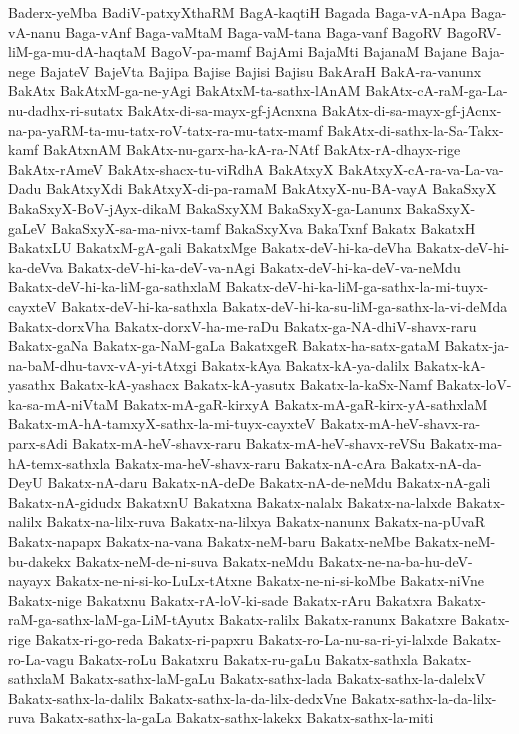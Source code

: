 {Baderx-yeMba
BadiV-patxyXthaRM
BagA-kaqtiH
Bagada
Baga-vA-nApa
Baga-vA-nanu
Baga-vAnf
Baga-vaMtaM
Baga-vaM-tana
Baga-vanf
BagoRV
BagoRV-liM-ga-mu-dA-haqtaM
BagoV-pa-mamf
BajAmi
BajaMti
BajanaM
Bajane
Baja-nege
BajateV
BajeVta
Bajipa
Bajise
Bajisi
Bajisu
BakAraH
BakA-ra-vanunx
BakAtx
BakAtxM-ga-ne-yAgi
BakAtxM-ta-sathx-lAnAM
BakAtx-cA-raM-ga-La-nu-dadhx-ri-sutatx
BakAtx-di-sa-mayx-gf-jAcnxna
BakAtx-di-sa-mayx-gf-jAcnx-na-pa-yaRM-ta-mu-tatx-roV-tatx-ra-mu-tatx-mamf
BakAtx-di-sathx-la-Sa-Takx-kamf
BakAtxnAM
BakAtx-nu-garx-ha-kA-ra-NAtf
BakAtx-rA-dhayx-rige
BakAtx-rAmeV
BakAtx-shacx-tu-viRdhA
BakAtxyX
BakAtxyX-cA-ra-va-La-va-Dadu
BakAtxyXdi
BakAtxyX-di-pa-ramaM
BakAtxyX-nu-BA-vayA
BakaSxyX
BakaSxyX-BoV-jAyx-dikaM
BakaSxyXM
BakaSxyX-ga-Lanunx
BakaSxyX-gaLeV
BakaSxyX-sa-ma-nivx-tamf
BakaSxyXva
BakaTxnf
Bakatx
BakatxH
BakatxLU
BakatxM-gA-gali
BakatxMge
Bakatx-deV-hi-ka-deVha
Bakatx-deV-hi-ka-deVva
Bakatx-deV-hi-ka-deV-va-nAgi
Bakatx-deV-hi-ka-deV-va-neMdu
Bakatx-deV-hi-ka-liM-ga-sathxlaM
Bakatx-deV-hi-ka-liM-ga-sathx-la-mi-tuyx-cayxteV
Bakatx-deV-hi-ka-sathxla
Bakatx-deV-hi-ka-su-liM-ga-sathx-la-vi-deMda
Bakatx-dorxVha
Bakatx-dorxV-ha-me-raDu
Bakatx-ga-NA-dhiV-shavx-raru
Bakatx-gaNa
Bakatx-ga-NaM-gaLa
BakatxgeR
Bakatx-ha-satx-gataM
Bakatx-ja-na-baM-dhu-tavx-vA-yi-tAtxgi
Bakatx-kAya
Bakatx-kA-ya-dalilx
Bakatx-kA-yasathx
Bakatx-kA-yashacx
Bakatx-kA-yasutx
Bakatx-la-kaSx-Namf
Bakatx-loV-ka-sa-mA-niVtaM
Bakatx-mA-gaR-kirxyA
Bakatx-mA-gaR-kirx-yA-sathxlaM
Bakatx-mA-hA-tamxyX-sathx-la-mi-tuyx-cayxteV
Bakatx-mA-heV-shavx-ra-parx-sAdi
Bakatx-mA-heV-shavx-raru
Bakatx-mA-heV-shavx-reVSu
Bakatx-ma-hA-temx-sathxla
Bakatx-ma-heV-shavx-raru
Bakatx-nA-cAra
Bakatx-nA-da-DeyU
Bakatx-nA-daru
Bakatx-nA-deDe
Bakatx-nA-de-neMdu
Bakatx-nA-gali
Bakatx-nA-gidudx
BakatxnU
Bakatxna
Bakatx-nalalx
Bakatx-na-lalxde
Bakatx-nalilx
Bakatx-na-lilx-ruva
Bakatx-na-lilxya
Bakatx-nanunx
Bakatx-na-pUvaR
Bakatx-napapx
Bakatx-na-vana
Bakatx-neM-baru
Bakatx-neMbe
Bakatx-neM-bu-dakekx
Bakatx-neM-de-ni-suva
Bakatx-neMdu
Bakatx-ne-na-ba-hu-deV-nayayx
Bakatx-ne-ni-si-ko-LuLx-tAtxne
Bakatx-ne-ni-si-koMbe
Bakatx-niVne
Bakatx-nige
Bakatxnu
Bakatx-rA-loV-ki-sade
Bakatx-rAru
Bakatxra
Bakatx-raM-ga-sathx-laM-ga-LiM-tAyutx
Bakatx-ralilx
Bakatx-ranunx
Bakatxre
Bakatx-rige
Bakatx-ri-go-reda
Bakatx-ri-papxru
Bakatx-ro-La-nu-sa-ri-yi-lalxde
Bakatx-ro-La-vagu
Bakatx-roLu
Bakatxru
Bakatx-ru-gaLu
Bakatx-sathxla
Bakatx-sathxlaM
Bakatx-sathx-laM-gaLu
Bakatx-sathx-lada
Bakatx-sathx-la-dalelxV
Bakatx-sathx-la-dalilx
Bakatx-sathx-la-da-lilx-dedxVne
Bakatx-sathx-la-da-lilx-ruva
Bakatx-sathx-la-gaLa
Bakatx-sathx-lakekx
Bakatx-sathx-la-miti
}
